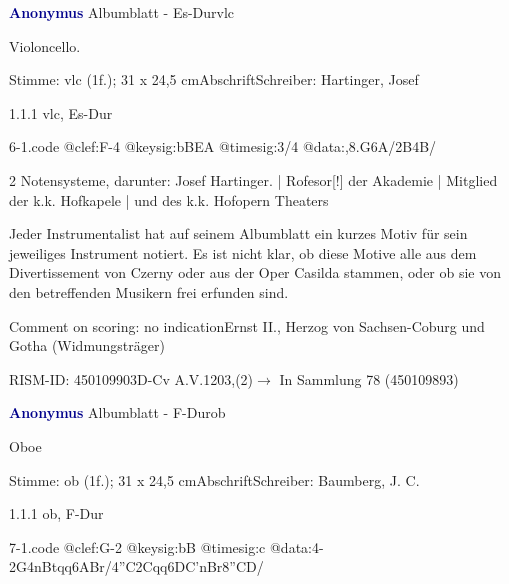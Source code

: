 \documentclass[a4paper, twocolumn, 11pt]{book}
\begin{document}
\par \vspace{16pt} \textcolor{darkblue}{\textbf{Anonymus  }}\hfillplus{[6]}\newline Albumblatt - Es-Dur\newline vlc
\par \begin{itshape}[heading:] Violoncello.\end{itshape} 
\par \textcolor{darkblue}{}  Stimme: vlc  (1f.); 31 x 24,5 cm\newline Abschrift\newline Schreiber: Hartinger, Josef
\par 1.1.1  vlc, Es-Dur  
\begin{filecontents*}{6-1.code}
@clef:F-4
@keysig:bBEA
@timesig:3/4
@data:,{8.G6A}/2B4B/%
\end{filecontents*}

\newline %
\par 2 Notensysteme, darunter: Josef Hartinger. | Rofesor[!] der Akademie | Mitglied der k.k. Hofkapele | und des k.k. Hofopern Theaters
\par Jeder Instrumentalist hat auf seinem Albumblatt ein kurzes Motiv für sein jeweiliges Instrument notiert. Es ist nicht klar, ob diese Motive alle aus dem {\textquotedbl}Divertissement{\textquotedbl} von Czerny oder aus der Oper {\textquotedbl}Casilda{\textquotedbl} stammen, oder ob sie von den betreffenden Musikern frei erfunden sind.
\par Comment on scoring: no indication\newline Ernst II., Herzog von Sachsen-Coburg und Gotha  (Widmungsträger)
\par RISM-ID: 450109903\newline D-Cv  A.V.1203,(2)\newline $\rightarrow$ In Sammlung 78 (450109893)
      
\par \vspace{16pt} \textcolor{darkblue}{\textbf{Anonymus  }}\hfillplus{[7]}\newline Albumblatt - F-Dur\newline ob
\par \begin{itshape}[heading:] Oboe\end{itshape} 
\par \textcolor{darkblue}{}  Stimme: ob  (1f.); 31 x 24,5 cm\newline Abschrift\newline Schreiber: Baumberg, J. C.
\par 1.1.1  ob, F-Dur  
\begin{filecontents*}{7-1.code}
@clef:G-2
@keysig:bB
@timesig:c
@data:4-2G4nBtqq{6AB}r/4''C2Cqq{6DC'nB}r{8''CD}/
\end{filecontents*}
\end{document}
